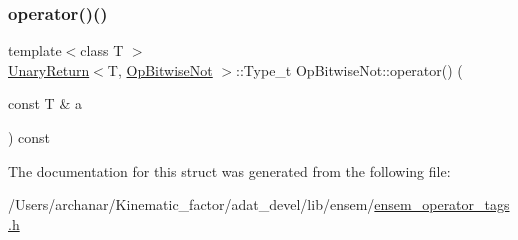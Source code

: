 \mbox{\label{structOpBitwiseNot_a32565bc96d1f735f04d98179d595ae07}} 
\subsubsection{\texorpdfstring{operator()()}{operator()()}\hspace{0.1cm}{\footnotesize\ttfamily [2/2]}}
{\footnotesize\ttfamily template$<$class T $>$ \\
\mbox{\hyperlink{structUnaryReturn}{Unary\+Return}}$<$T, \mbox{\hyperlink{structOpBitwiseNot}{Op\+Bitwise\+Not}} $>$\+::Type\+\_\+t Op\+Bitwise\+Not\+::operator() (\begin{DoxyParamCaption}\item[{const T \&}]{a }\end{DoxyParamCaption}) const\hspace{0.3cm}{\ttfamily [inline]}}



The documentation for this struct was generated from the following file\+:\begin{DoxyCompactItemize}
\item 
/\+Users/archanar/\+Kinematic\+\_\+factor/adat\+\_\+devel/lib/ensem/\mbox{\hyperlink{lib_2ensem_2ensem__operator__tags_8h}{ensem\+\_\+operator\+\_\+tags.\+h}}\end{DoxyCompactItemize}
